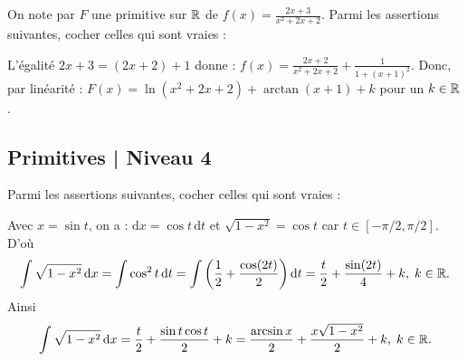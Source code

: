 \begin{question}
On note par $F$ une primitive sur $\mathbb{R}$ de $\displaystyle f(x)=\frac{2x+3}{x^2+2x+2}$. Parmi les assertions suivantes, cocher celles qui sont vraies :
\begin{answers}
\end{answers}
\begin{explanations}
L'égalité $2x+3=(2x+2)+1$ donne : $\displaystyle f(x)=\frac{2x+2}{x^2+2x+2}+\frac{1}{1+(x+1)^2}$. Donc, par linéarité : $F(x)=\ln (x^2+2x+2)+\arctan (x+1)+k$ pour un $k\in \mathbb{R}$.
\end{explanations}
\end{question}  


\subsection{Primitives | Niveau 4}

\begin{question}
Parmi les assertions suivantes, cocher celles qui sont vraies :
\begin{answers} 
\end{answers}
\begin{explanations}
Avec $x=\sin t$, on a : $\mathrm{d}x=\cos t\, \mathrm{d}t$ et $\sqrt{1-x^2}=\cos t$ car $t\in [-\pi/2,\pi/2]$. D'où
$$\int \sqrt{1-x^2}\, \mathrm{d}x=\int \cos ^2t\, \mathrm{d}t=\int \left(\frac{1}{2}+\frac{\cos (2t)}{2}\right)\mathrm{d}t=\frac{t}{2}+\frac{\sin (2t)}{4}+k,\; k\in \mathbb{R}.$$
Ainsi
$$\int \sqrt{1-x^2}\, \mathrm{d}x=\frac{t}{2}+\frac{\sin t\cos t}{2}+k=\frac{\arcsin x}{2}+\frac{x\sqrt{1-x^2}}{2}+k,\; k\in \mathbb{R}.$$
\end{explanations}
\end{question}  

